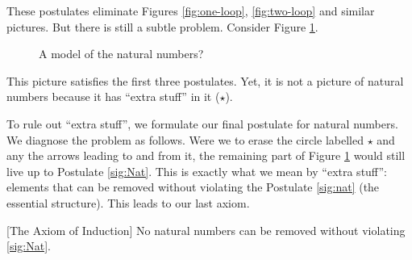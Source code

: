 These postulates eliminate Figures \ref{fig:one-loop}, \ref{fig:two-loop} and similar pictures.  
But there is still a subtle problem. 
Consider Figure \ref{fig:nonstandard}.

\begin{figure}[h]
  \centering
  \caption{A model of the natural numbers?}
  \label{fig:nonstandard}
\end{figure}

This picture satisfies the first three postulates. 
Yet, it is not a picture of natural numbers because it has ``extra stuff'' in it ($\star$).

\ipadbreak

To rule out ``extra stuff'', we formulate our final postulate for natural numbers.
We diagnose the problem as follows.
Were we to erase the circle labelled $\star$ and any the arrows leading to and from it, the remaining part of Figure \ref{fig:nonstandard} would still live up to Postulate \ref{sig:Nat}.
This is exactly what we mean by ``extra stuff'': 
elements that can be removed without violating the Postulate \ref{sig:nat} (the essential structure). 
This leads to our last axiom. 

\begin{postulate}\label{ax:NatInd}
[The Axiom of Induction] No natural numbers can be removed without violating \ref{sig:Nat}.
\end{postulate}


